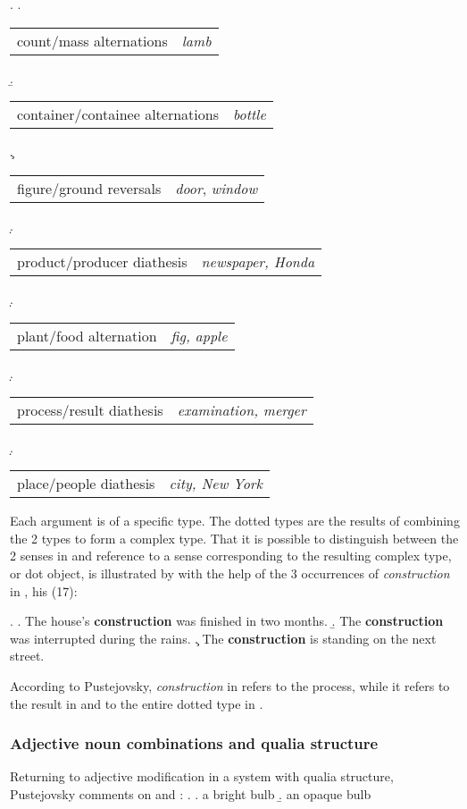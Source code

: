 \ex. \a.
\begin{tabular}[t]{p{6cm}p{6cm}}
count/mass alternations& \emph{lamb}  
\end{tabular}
\b. \begin{tabular}[t]{p{6cm}p{6cm}}
container/containee alternations& \emph{bottle}
\end{tabular}
\c. \begin{tabular}[t]{p{6cm}p{6cm}}
figure/ground reversals& \emph{door}, \emph{window}
\end{tabular}
\d. \begin{tabular}[t]{p{6cm}p{6cm}}
product/producer diathesis& \emph{newspaper, Honda}
\end{tabular}
\d. \begin{tabular}[t]{p{6cm}p{6cm}}
plant/food alternation& \emph{fig, apple}
\end{tabular}
\d. \begin{tabular}[t]{p{6cm}p{6cm}}
process/result diathesis& \emph{examination, merger}
\end{tabular}
\d. \begin{tabular}[t]{p{6cm}p{6cm}}
place/people diathesis& \emph{city, New York}
\end{tabular}

Each argument is of a specific type. The dotted types are the results
of combining the 2 types to form a complex type. That it is possible to
distinguish between the 2 senses in \Last and reference to a sense
corresponding to the resulting complex
type, or dot object, is illustrated by \citet[94]{Pustejovsky:1995}
with the help of the 3 occurrences of \emph{construction} in
\Next, his (17):

\ex. \a. The house's \textbf{construction} was finished in two months.
\b. The \textbf{construction} was interrupted during the rains.
\c. The \textbf{construction} is standing on the next street.

According to Pustejovsky, \emph{construction} in \Last[b] refers to the
process, while it refers to the result in \Last[c] and to the entire
dotted type in \Last[a].

\subsubsection{Adjective noun combinations and qualia structure}
\label{sec:adj_nouns_pustejovsky}

Returning to adjective modification in a system with qualia structure,
Pustejovsky comments on \Next and \NNext:
\ex. \label{ex:pust1995:p89:ex6}
\a. a bright bulb
\b. an opaque bulb

